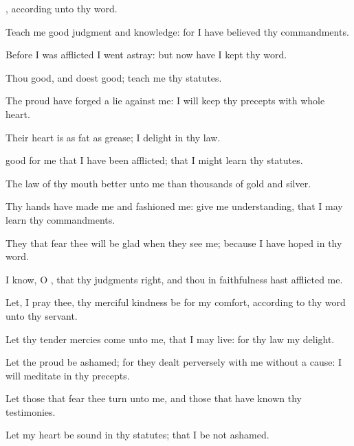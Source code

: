 {{}, according unto thy
word.
\par }{\Q {}Teach me
good
judgment and
knowledge: for I have
believed thy
commandments.
\par }{\Q {}Before I was
afflicted I went
astray: but now have I
kept thy
word.
\par }{\Q {}Thou
{}
good, and doest
good;
teach me thy
statutes.
\par }{\BB \par }{\Q {}The
proud have
forged a
lie against me:
{} I will
keep thy
precepts with
{} whole
heart.
\par }{\Q {}Their
heart is as
fat as
grease;
{} I
delight in thy
law.
\par }{\Q {}
good for me that I have been
afflicted; that I might
learn thy
statutes.
\par }{\Q {}The
law of thy
mouth
{}
better unto me than
thousands of
gold and
silver.
\par }{
\par }{\Q {}Thy
hands have
made me and
fashioned me: give me
understanding, that I may
learn thy
commandments.
\par }{\Q {}They that
fear thee will be
glad when they
see me; because I have
hoped in thy
word.
\par }{\Q {}I
know, O
{}, that thy
judgments
{}
right, and
{} thou in
faithfulness hast
afflicted me.
\par }{\BB \par }{\Q {}Let, I pray thee, thy merciful
kindness be for my
comfort, according to thy
word unto thy
servant.
\par }{\Q {}Let thy tender
mercies
come unto me, that I may
live: for thy
law
{} my
delight.
\par }{\BB \par }{\Q {}Let the
proud be
ashamed; for they dealt
perversely with me without a
cause:
{} I will
meditate in thy
precepts.
\par }{\Q {}Let those that
fear thee
turn unto me, and those that have
known thy
testimonies.
\par }{\Q {}Let my
heart be
sound in thy
statutes; that I be not
ashamed.
\par }{\BB \par }{
}
